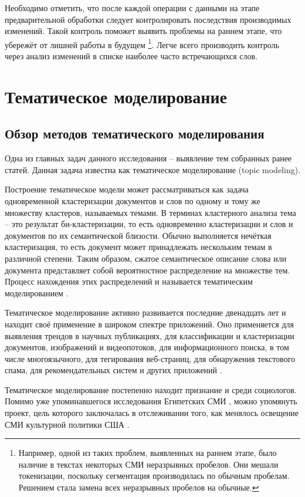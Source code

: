 Необходимо отметить, что после каждой операции с данными на этапе предварительной обработки следует контролировать последствия производимых изменений. Такой контроль поможет выявить проблемы на раннем этапе, что убережёт от лишней работы в будущем \footnote{Например, одной из таких проблем, выявленных на раннем этапе, было наличие в текстах некоторых СМИ неразрывных пробелов. Они мешали токенизации, поскольку сегментация производилась по обычным пробелам. Решением стала замена всех неразрывных пробелов на обычные.}. Легче всего производить контроль через анализ изменений в списке наиболее часто встречающихся слов.

\section{Тематическое моделирование}

\subsection{Обзор методов тематического моделирования}
Одна из главных задач данного исследования -- выявление тем собранных ранее статей. Данная задача известна как тематическое моделирование (topic modeling).

Построение тематическое модели может рассматриваться как задача одновременной кластеризации документов и слов по одному и тому же множеству кластеров, называемых темами. В терминах кластерного анализа тема -- это результат би-кластеризации, то есть одновременно кластеризации и слов и документов по их семантической близости. Обычно выполняется нечёткая кластеризация, то есть документ может принадлежать нескольким темам в различной степени. Таким образом, сжатое семантическое описание слова или документа представляет собой вероятностное распределение на множестве тем. Процесс нахождения этих распределений и называется тематическим моделированием \cite{korshunov2012}.

Тематическое моделирование активно развивается последние двенадцать лет и находит своё применение в широком спектре приложений. Оно применяется для выявления трендов в научных публикациях, для классификации и кластеризации документов, изображений и видеопотоков, для информационного поиска, в том числе многоязычного, для тегирования веб-страниц, для обнаружения текстового спама, для рекомендательных систем и других приложений \cite[стр. 4]{voroncov2013}. 

Тематическое моделирование постепенно находит признание и среди социологов. Помимо уже упоминавшегося исследования Египетских СМИ \cite{EgyptianUprising2012}, можно упомянуть проект, цель которого заключалась в отслеживании того, как менялось освещение СМИ культурной политики США \cite{poetics_topics}.

